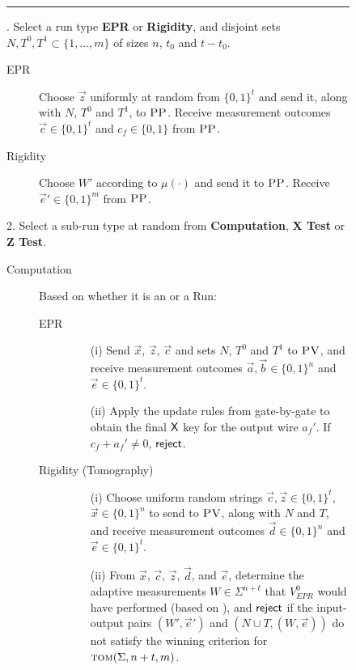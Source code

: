 \documentclass{toc}
\newcommand{\tom}{\textsc{tom}}
\newcommand{\pv}{\textsc{PV}}
\newcommand{\pp}{\textsc{PP}}
\begin{document}
\begin{figure}[H]
\rule[1ex]{\textwidth}{0.5pt}
\vspace{-20pt}
. Select a run type \textbf{EPR} or \textbf{Rigidity}, and disjoint sets $N,T^0,T^1\subset \{1,\ldots,m\}$ of sizes $n$, $t_0$ and $t-t_0$.  
\begin{description}
\item[EPR] Choose $\vec{z}$ uniformly at random from $\{0,1\}^t$ and send it, along with $N$, $T^0$ and $T^1$, to $\pp$. Receive measurement outcomes $\vec{c}\in\{0,1\}^t$ and $c_f\in\{0,1\}$ from $\pp$.
\vspace{-0.15cm}  %
\item[Rigidity] Choose $W'$ according to $\mu(\cdot)$ and send it to $\pp$. Receive $\vec{e}'\in \{0,1\}^m$ from $\pp$. 
\end{description}
2. Select a sub-run type at random from \textbf{Computation}, \textbf{X Test} or \textbf{Z Test}. 
\begin{description}
\item[Computation] Based on whether it is
an  or a  Run:
\vspace{-0.07cm}   %
	\begin{description}
	\item[EPR]
		\begin{enumerate}
		\item[(i)] Send $\vec{x}$, $\vec{z}$, $\vec{c}$ and sets $N$, $T^0$ and $T^1$ to $\pv$, and receive measurement outcomes $\vec{a},\vec{b}\in \{0,1\}^n$ and $\vec{e}\in\{0,1\}^t$.
		\item[(ii)] Apply the update rules from  gate-by-gate to obtain the final $\sf X$ key for the output wire $a_f'$. If $c_f+a_f'\neq 0$, $\sf reject$. 
		\end{enumerate}
\vspace{-0.15cm}  %
	\item[Rigidity (Tomography)]
		\begin{enumerate}
		\item[(i)] Choose uniform random strings $\vec{c},\vec{z}\in\{0,1\}^t$, $\vec{x} \in \{0,1\}^n$ 
		to send to $\pv$, along with $N$ and $T$, and receive measurement outcomes $\vec{d}\in \{0,1\}^n$ and $\vec{e}\in\{0,1\}^t$. 
		\item[(ii)]
		From $\vec{x}$, $\vec{c}$, $\vec{z}$, $\vec{d}$, and $\vec{e}$, determine the adaptive measurements $W\in\Sigma^{n+t}$ that $V_{EPR}^0$ would have performed (based on ), and $\sf reject$ if the input-output pairs $(W',\vec{e}')$ and $(N\cup T,(W,\vec{e}))$ do not satisfy the winning criterion for $\tom(\Sigma,n+t,m)$.

\end{enumerate}
\end{description}
\end{description}
\end{figure}
\end{document}
